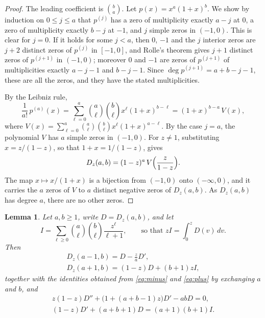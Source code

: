 \documentclass{amsart}
\newtheorem{lemma}[theorem]{Lemma}
\theoremstyle{definition}
\theoremstyle{remark}
\numberwithin{equation}{section}
\numberwithin{table}{section}
\newcommand{\Dz}{D_z}
\begin{document}
\begin{proof}
The leading coefficient is $\binom{b}{a}$. Let $p(x)=x^a(1+x)^b$. We show by induction on $0\le j\le a$ that $p^{(j)}$ has a zero of multiplicity exactly $a-j$ at $0$, a zero of multiplicity exactly $b-j$ at $-1$, and $j$ simple zeros in $(-1,0)$. This is clear for $j=0$. If it holds for some $j<a$, then $0$, $-1$ and the $j$ interior zeros are $j+2$ distinct zeros of $p^{(j)}$ in $[-1,0]$, and Rolle's theorem gives $j+1$ distinct zeros of $p^{(j+1)}$ in $(-1,0)$; moreover $0$ and $-1$ are zeros of $p^{(j+1)}$ of multiplicities exactly $a-j-1$ and $b-j-1$. Since $\deg p^{(j+1)}=a+b-j-1$, these are all the zeros, and they have the stated multiplicities.

By the Leibniz rule,
\[
\frac{1}{a!}\,p^{(a)}(x)=\sum_{\ell=0}^{a}\binom{a}{\ell}\binom{b}{\ell}x^{\ell}(1+x)^{b-\ell}=(1+x)^{b-a}\,V(x),
\]
where $V(x)=\sum_{\ell=0}^{a}\binom{a}{\ell}\binom{b}{\ell}x^{\ell}(1+x)^{a-\ell}$. By the case $j=a$, the polynomial $V$ has $a$ simple zeros in $(-1,0)$. For $z\neq 1$, substituting $x=z/(1-z)$, so that $1+x=1/(1-z)$, gives
\[
\Dz(a,b)=(1-z)^a\,V\Bigl(\frac{z}{1-z}\Bigr).
\]
The map $x\mapsto x/(1+x)$ is a bijection from $(-1,0)$ onto $(-\infty,0)$, and it carries the $a$ zeros of $V$ to $a$ distinct negative zeros of $\Dz(a,b)$. As $\Dz(a,b)$ has degree $a$, there are no other zeros.
\end{proof}

\begin{lemma}\label{lem:contiguous}
Let $a,b\ge 1$, write $D=\Dz(a,b)$, and let
\[
I=\sum_{\ell\ge 0}\binom{a}{\ell}\binom{b}{\ell}\frac{z^{\ell}}{\ell+1},\qquad\text{so that } zI=\int_0^z D(v)\,dv.
\]
Then
\begin{gather}
\Dz(a-1,b)=D-\frac{z}{a}D',\label{eq:minus}\\
\Dz(a+1,b)=(1-z)D+(b+1)zI,\label{eq:plus}
\end{gather}
together with the identities obtained from \eqref{eq:minus} and \eqref{eq:plus} by exchanging $a$ and $b$, and
\begin{gather}
z(1-z)D''+\bigl(1+(a+b-1)z\bigr)D'-abD=0,\label{eq:ode}\\
(1-z)D'+(a+b+1)D=(a+1)(b+1)I.\label{eq:integrated}
\end{gather}
\end{lemma}
\end{document}
